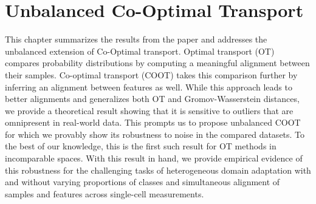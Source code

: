 
\chapter[Unbalanced Co-Optimal Transport]{Unbalanced Co-Optimal Transport}
\label{chap:ucoot}

\renewcommand{\contentsname}{Contents}
\localtableofcontents*
{}

\hfill \break

\raggedbottom



This chapter summarizes the results from the paper \citep{Tran23} and addresses
the unbalanced extension of Co-Optimal transport.
Optimal transport (OT) compares probability distributions by computing a meaningful alignment
between their samples. Co-optimal transport (COOT) takes this comparison further
by inferring an alignment between features as well. While this approach leads to
better alignments and generalizes both OT and Gromov-Wasserstein distances,
we provide a theoretical result showing that it is sensitive to outliers
that are omnipresent in real-world data. This prompts us to propose unbalanced COOT
for which we provably show its robustness to noise in the compared datasets.
To the best of our knowledge, this is the first such result for OT methods in incomparable spaces.
With this result in hand, we provide empirical evidence of this robustness
for the challenging tasks of heterogeneous domain adaptation with and without
varying proportions of classes and simultaneous alignment of samples and features across
single-cell measurements.

